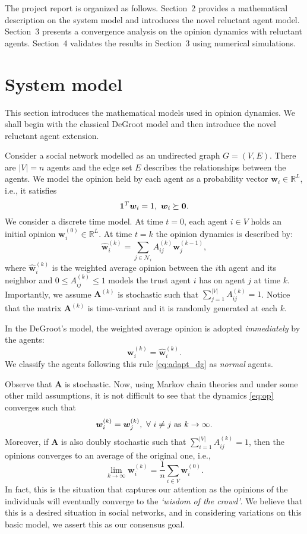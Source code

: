 \documentclass[letter]{article}
\theoremstyle{remark}
\begin{document}
The project report is organized as follows. Section~2 provides a mathematical description on the system model and introduces the novel reluctant agent model. Section~3 presents a convergence analysis on the opinion dynamics with reluctant agents. Section~4 validates the results in Section~3 using numerical simulations. 


\section{System model}
This section introduces the mathematical models used in opinion dynamics. We shall begin with the classical DeGroot model and then introduce the novel reluctant agent extension. 

Consider a social network modelled as an undirected graph $G = (V,E)$. There are $|V| = n$ agents and the edge set $E$ describes the relationships between the agents. 
We model the opinion held by each agent as a probability vector $\bm{w}_i \in \mathbb{R}^L$, i.e., it satisfies
\[
{\bf 1}^T \bm{w}_i = 1,~{\bm w}_i \succeq {\bf 0}.
\]
We consider a discrete time model. 
At time $t = 0$, each agent $i \in V$ holds an initial opinion ${\bm w}_i^{(0)} \in \mathbb{R}^L$. At time $t = k$ the opinion dynamics is described by:
\begin{equation}\label{eq:op}
\hat{\bm w}_i^{(k)} = \sum_{j \in \mathcal{N}_i} A_{ij}^{(k)} {\bm w}_j^{(k-1)},
\end{equation}
where $\hat{\bm w}_i^{(k)}$ is the weighted average opinion between the $i$th agent and its neighbor and $0 \leq A_{ij}^{(k)} \leq 1$ models the trust agent $i$ has on agent $j$ at time $k$. Importantly, we assume $\bm{A}^{(k)}$ is stochastic such that $\sum_{j=1}^{|V|} A_{ij}^{(k)} = 1$. Notice that the matrix ${\bm A}^{(k)}$ is time-variant and it is randomly generated at each $k$. 

In the DeGroot's model, the weighted average opinion is adopted \emph{immediately} by the agents:
\begin{equation} \label{eq:adapt_dg}
{\bm w}_i^{(k)} = \hat{\bm w}_i^{(k)}.
\end{equation}
We classify the agents following this rule \eqref{eq:adapt_dg} as \emph{normal} agents.

Observe that $\bm{A}$ is stochastic. Now, using Markov chain theories and under some other mild assumptions, it is not difficult to see that the dynamics \eqref{eq:op} converges such that
\[
{\bm w}_i^{(k)} = {\bm w}_j^{(k)},~\forall~i \neq j~{\rm as}~k \rightarrow \infty.
\]
Moreover, if $\bm{A}$ is also doubly stochastic such that $\sum_{i=1}^{|V|} A_{ij}^{(k)} = 1$, then the opinions converges to an average of the original one, i.e.,
\[
\lim_{k \rightarrow \infty} {\bm w}_i^{(k)}  = \frac{1}{n} \sum_{i \in V} {\bm w}_i^{(0)}.
\]
In fact, this is the situation that captures our attention as the opinions of the individuals will eventually converge to the \emph{`wisdom of the crowd'}. We believe that this is a desired situation in social networks, and in considering variations on this basic model, we assert this as our consensus goal.
\end{document}
